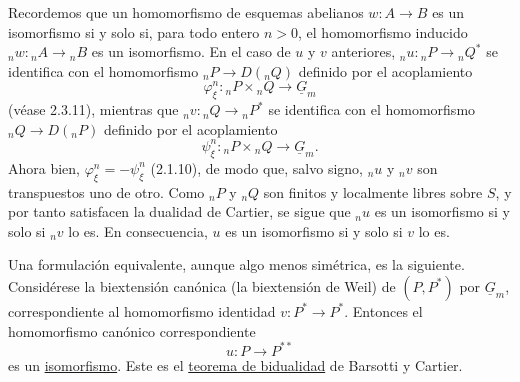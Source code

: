 Recordemos que un homomorfismo de esquemas abelianos
$w:A\longrightarrow B$ es un isomorfismo si y solo si, para todo
entero $n>0$, el homomorfismo inducido
${}_nw:{}_nA\longrightarrow{}_nB$ es un isomorfismo. En el caso de
$u$ y $v$ anteriores, ${}_nu:{}_nP\longrightarrow{}_nQ^*$ se
identifica con el homomorfismo
${}_nP\longrightarrow D({}_nQ)$ definido por el acoplamiento
\[
 \varphi_\xi^n:{}_nP\times{}_nQ\longrightarrow\underline G_m
\]
(véase 2.3.11), mientras que ${}_nv:{}_nQ\longrightarrow{}_nP^*$ se
identifica con el homomorfismo
${}_nQ\longrightarrow D({}_nP)$ definido por el acoplamiento
\[
 \psi_\xi^n:{}_nP\times{}_nQ\longrightarrow\underline G_m.
\]
Ahora bien, $\varphi_\xi^n=-\psi_\xi^n$ (2.1.10), de modo que, salvo
signo, ${}_nu$ y ${}_nv$ son transpuestos uno de otro. Como ${}_nP$ y
${}_nQ$ son finitos y localmente libres sobre $S$, y por tanto
satisfacen la dualidad de Cartier, se sigue que ${}_nu$ es un
isomorfismo si y solo si ${}_nv$ lo es. En consecuencia, $u$ es un
isomorfismo si y solo si $v$ lo es.

Una formulación equivalente, aunque algo menos simétrica, es la
siguiente. Considérese la biextensión canónica (la biextensión de
Weil) de $(P,P^*)$ por $\underline G_m$, correspondiente al
homomorfismo identidad $v:P^*\longrightarrow P^*$. Entonces el
homomorfismo canónico correspondiente
\[
 u:P\longrightarrow P^{**}
\]
es un \underline{isomorfismo}. Este es el \underline{teorema de
bidualidad} de Barsotti y Cartier.
